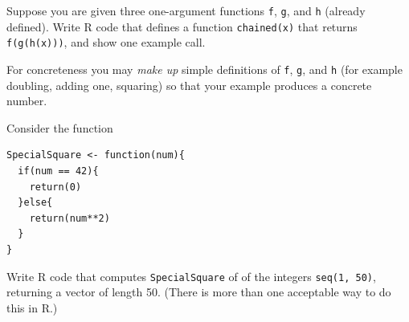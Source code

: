 \question{}

\subquestion[6]{}
Suppose you are given three one-argument functions \verb|f|, \verb|g|, and \verb|h| (already defined). Write R code that defines a function \verb|chained(x)| that returns \verb|f(g(h(x)))|, and show one example call.

For concreteness you may \emph{make up} simple definitions of \verb|f|, \verb|g|, and \verb|h| (for example doubling, adding one, squaring) so that your example produces a concrete number.

\ifanswerspace
\vfillstretch
\fi

\subquestion[6]{}
Consider the function

\begin{verbatim}
SpecialSquare <- function(num){
  if(num == 42){
    return(0)
  }else{
    return(num**2)
  }
}
\end{verbatim}

Write R code that computes \verb|SpecialSquare| of  of the integers \verb|seq(1, 50)|, returning a vector of length 50. (There is more than one acceptable way to do this in R.)

\ifanswerspace
\vfillstretch
\fi
